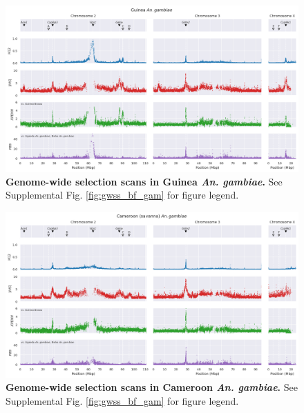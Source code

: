 \documentclass[a4paper,11pt,abstracton,hidelinks]{scrartcl}
\begin{document}
\begin{landscape}
\begin{figure}[t!]
	\begin{center}
		\includegraphics*[width=1.05\linewidth,center]{artwork/gwss_gn_gam_gw_ug_gam_gq_gam.png}
	\end{center}
	\caption[Genome-wide selection scans in Guinea \textit{An. gambiae}]{
	\textbf{Genome-wide selection scans in Guinea \textit{An. gambiae}.} 
	See Supplemental Fig. \ref{fig:gwss_bf_gam} for figure legend.
	} 
	\label{fig:gwss_gn_gam}
\end{figure}


\begin{figure}[t!]
	\begin{center}
		\includegraphics*[width=1.05\linewidth,center]{artwork/gwss_cm_sav_gam_gw_ug_gam_gq_gam.png}
	\end{center}
	\caption[Genome-wide selection scans in Cameroon \textit{An. gambiae}]{
	\textbf{Genome-wide selection scans in Cameroon \textit{An. gambiae}.} 
	See Supplemental Fig. \ref{fig:gwss_bf_gam} for figure legend.
	} 
	\label{fig:gwss_cm_sav_gam}
\end{figure}



\end{landscape}
\end{document}
